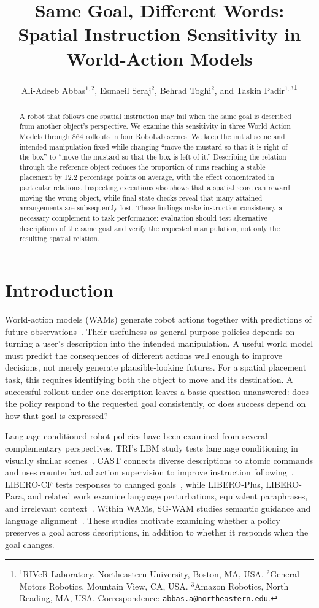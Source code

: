 \documentclass{article}
\title{Same Goal, Different Words:\\Spatial Instruction Sensitivity in World-Action Models}
\author{Ali-Adeeb Abbas$^{1,2}$, Esmaeil Seraj$^2$, Behrad Toghi$^2$, and Taskin Padir$^{1,3}$\thanks{$^1$RIVeR Laboratory, Northeastern University, Boston, MA, USA. $^2$General Motors Robotics, Mountain View, CA, USA. $^3$Amazon Robotics, North Reading, MA, USA. Correspondence: \texttt{abbas.a@northeastern.edu}.}}
\begin{document}
\maketitle
\begin{abstract}
A robot that follows one spatial instruction may fail when the same goal is described from another object's perspective. We examine this sensitivity in three World Action Models through 864 rollouts in four RoboLab scenes. We keep the initial scene and intended manipulation fixed while changing ``move the mustard so that it is right of the box'' to ``move the mustard so that the box is left of it.'' Describing the relation through the reference object reduces the proportion of runs reaching a stable placement by 12.2 percentage points on average, with the effect concentrated in particular relations. Inspecting executions also shows that a spatial score can reward moving the wrong object, while final-state checks reveal that many attained arrangements are subsequently lost. These findings make instruction consistency a necessary complement to task performance: evaluation should test alternative descriptions of the same goal and verify the requested manipulation, not only the resulting spatial relation.
\end{abstract}

\setlength{\parskip}{2.5pt}
\section{Introduction}
World-action models (WAMs) generate robot actions together with predictions of future observations~\citep{kim2026cosmospolicy}. Their usefulness as general-purpose policies depends on turning a user's description into the intended manipulation. A useful world model must predict the consequences of different actions well enough to improve decisions, not merely generate plausible-looking futures. For a spatial placement task, this requires identifying both the object to move and its destination. A successful rollout under one description leaves a basic question unanswered: does the policy respond to the requested goal consistently, or does success depend on how that goal is expressed?

Language-conditioned robot policies have been examined from several complementary perspectives. TRI's LBM study tests language conditioning in visually similar scenes~\citep{tri2025lbm}. CAST connects diverse descriptions to atomic commands and uses counterfactual action supervision to improve instruction following~\citep{glossop2025cast}. LIBERO-CF tests responses to changed goals~\citep{fang2026counterfactual}, while LIBERO-Plus, LIBERO-Para, and related work examine language perturbations, equivalent paraphrases, and irrelevant context~\citep{fei2026liberoplus,kim2026liberopara,moskalenko2026bring}. Within WAMs, SG-WAM studies semantic guidance and language alignment~\citep{he2026sgwam}. These studies motivate examining whether a policy preserves a goal across descriptions, in addition to whether it responds when the goal changes.
\end{document}

